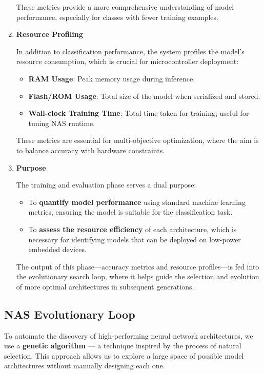 \begin{enumerate}
\begin{itemize}
\end{itemize}

These metrics provide a more comprehensive understanding of model performance, especially for classes with fewer training examples.

\item \textbf{Resource Profiling}

In addition to classification performance, the system profiles the model’s resource consumption, which is crucial for microcontroller deployment:
\begin{itemize}
    \item \textbf{RAM Usage}: Peak memory usage during inference.
    \item \textbf{Flash/ROM Usage}: Total size of the model when serialized and stored.
    \item \textbf{Wall-clock Training Time}: Total time taken for training, useful for tuning NAS runtime.
\end{itemize}

These metrics are essential for multi-objective optimization, where the aim is to balance accuracy with hardware constraints.
\item \textbf{Purpose}

The training and evaluation phase serves a dual purpose:
\begin{itemize}
    \item To \textbf{quantify model performance} using standard machine learning metrics, ensuring the model is suitable for the classification task.
    \item To\textbf{ assess the resource efficiency }of each architecture, which is necessary for identifying models that can be deployed on low-power embedded devices.
\end{itemize}

The output of this phase—accuracy metrics and resource profiles—is fed into the evolutionary search loop, where it helps guide the selection and evolution of more optimal architectures in subsequent generations.


    
\end{enumerate}




\subsection{NAS Evolutionary Loop}

To automate the discovery of high-performing neural network architectures, we use a \textbf{genetic algorithm} — a technique inspired by the process of natural selection. This approach allows us to explore a large space of possible model architectures without manually designing each one.

